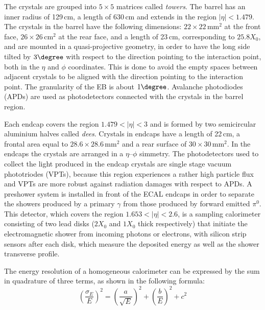 The crystals are grouped into $5\times5$ matrices called \emph{towers}. The barrel has an inner radius of 129\,cm, a length of 630\,cm and extends in the region $|\eta|<1.479$. The crystals in the barrel have the following dimensions: $22\times22\,\mathrm{mm^2}$ at the front face, $26\times26\,\mathrm{cm^2}$ at the rear face, and a length of 23\,cm, corresponding to $25.8 X_0$, and are mounted in a quasi-projective geometry, in order to have the long side tilted by $3\degree$ with respect to the direction pointing to the interaction point, both in the $\eta$ and $\phi$ coordinates. This is done to avoid the empty spaces between adjacent crystals to be aligned with the direction pointing to the interaction point. The granularity of the EB is about $1\degree$.
Avalanche photodiodes (APDs) are used as photodetectors connected with the crystals in the barrel region.

Each endcap covers the region $1.479 < |\eta| < 3$ and is formed by two semicircular aluminium halves called \emph{dees}. Crystals in endcaps have a length of 22\,cm, a frontal area equal to $28.6\times 28.6\,\mathrm{mm^2}$ and a rear surface of $30\times 30\,\mathrm{mm^2}$. In the endcaps the crystals are arranged in a $\eta$--$\phi$ simmetry. The photodetectors used to collect the light produced in the endcap crystals are single stage vacuum phototriodes (VPTs), because this region experiences a rather high particle flux and VPTs are more robust against radiation damages with respect to APDs. A preshower system is installed in front of the ECAL endcaps in order to separate the showers produced by a primary $\gamma$ from those produced by forward emitted $\pi^0$. This detector, which covers the region $1.653<|\eta|<2.6$, is a sampling calorimeter consisting of two lead disks ($2 X_0$ and $1 X_0$ thick respectively) that initiate the electromagnetic shower from incoming photons or electrons, with silicon strip sensors after each disk, which measure the deposited energy as well as the shower transverse profile.

The energy resolution of a homogeneous calorimeter can be expressed by the sum in quadrature of three terms, as shown in the following formula:
\begin{equation}
\left(\frac{\sigma_E}{E}\right)^2 = \left(\frac{a}{\sqrt{E}}\right)^2 + \left(\frac{b}{E}\right)^2 + c^2
\end{equation}

